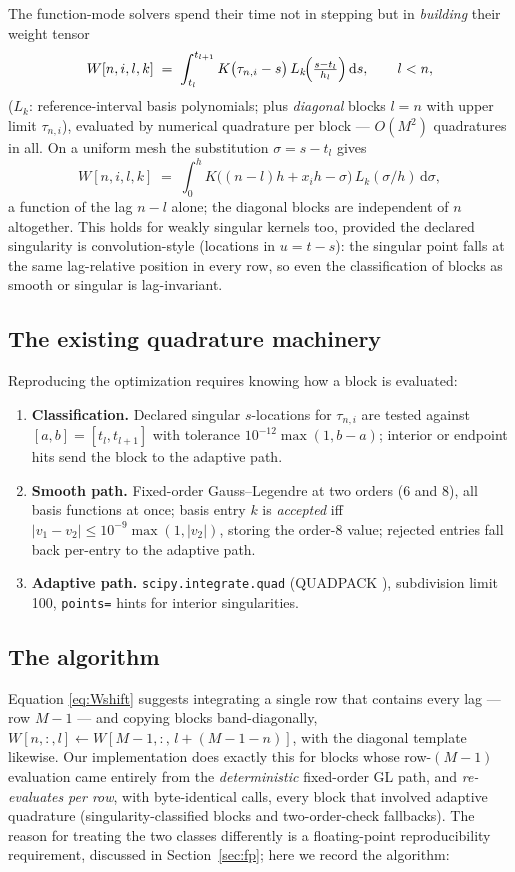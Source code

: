 \documentclass[11pt]{article}
\newcommand{\dd}{\,\mathrm{d}}
\begin{document}
The function-mode solvers spend their time not in stepping but in
\emph{building} their weight tensor
\begin{equation}
W[n,i,l,k] \;=\;
\int_{t_l}^{t_{l+1}} K\bigl(\tau_{n,i}-s\bigr)\,
L_k\!\Bigl(\tfrac{s-t_l}{h_l}\Bigr)\dd s ,
\qquad l < n,
\label{eq:Wdef}
\end{equation}
($L_k$: reference-interval basis polynomials; plus \emph{diagonal}
blocks $l=n$ with upper limit $\tau_{n,i}$), evaluated by numerical
quadrature per block --- $O(M^2)$ quadratures in all. On a uniform mesh
the substitution $\sigma=s-t_l$ gives
\begin{equation}
W[n,i,l,k] \;=\;
\int_{0}^{h} K\bigl((n-l)h + x_i h - \sigma\bigr)\,
L_k(\sigma/h)\dd\sigma ,
\label{eq:Wshift}
\end{equation}
a function of the lag $n-l$ alone; the diagonal blocks are independent
of $n$ altogether. This holds for weakly singular kernels too, provided
the declared singularity is convolution-style (locations in $u=t-s$):
the singular point falls at the same lag-relative position in every
row, so even the classification of blocks as smooth or singular is
lag-invariant.

\subsection{The existing quadrature machinery}
Reproducing the optimization requires knowing how a block is evaluated:
\begin{enumerate}
\item \textbf{Classification.} Declared singular $s$-locations for
  $\tau_{n,i}$ are tested against $[a,b]=[t_l,t_{l+1}]$ with tolerance
  $10^{-12}\max(1,b-a)$; interior or endpoint hits send the block to
  the adaptive path.
\item \textbf{Smooth path.} Fixed-order Gauss--Legendre at two orders
  (6 and 8), all basis functions at once; basis entry $k$ is
  \emph{accepted} iff $|v_1-v_2|\le 10^{-9}\max(1,|v_2|)$, storing the
  order-8 value; rejected entries fall back per-entry to the adaptive
  path.
\item \textbf{Adaptive path.} \texttt{scipy.integrate.quad} (QUADPACK
  \cite{quadpack}), subdivision limit 100, \texttt{points=} hints for
  interior singularities.
\end{enumerate}

\subsection{The algorithm}
Equation \eqref{eq:Wshift} suggests integrating a single row that
contains every lag --- row $M{-}1$ --- and copying blocks
band-diagonally, $W[n,:,l]\leftarrow W[M{-}1,:,\,l+(M{-}1{-}n)]$, with
the diagonal template likewise. Our implementation does exactly this
for blocks whose row-$(M{-}1)$ evaluation came entirely from the
\emph{deterministic} fixed-order GL path, and \emph{re-evaluates
per row}, with byte-identical calls, every block that involved adaptive
quadrature (singularity-classified blocks and two-order-check
fallbacks). The reason for treating the two classes differently is a
floating-point reproducibility requirement, discussed in
Section~\ref{sec:fp}; here we record the algorithm:
\end{document}

